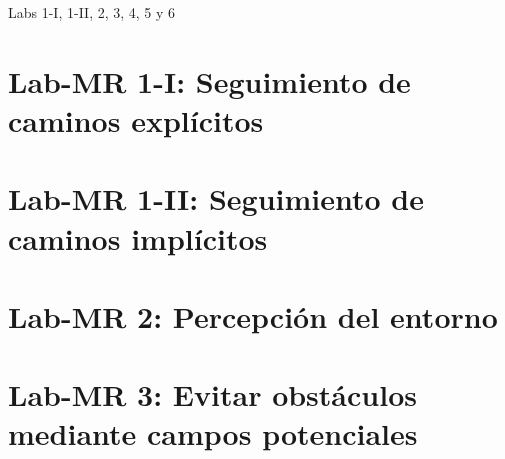 \documentclass[12pt]{report}
\newcommand{\commonpath}{../../common}
\begin{document}
\renewcommand{\pioneer}{\matlab}

%
        {Labs 1-I, 1-II, 2, 3, 4, 5 y 6}

\tableofcontents
\clearpage


\chapter{Lab-MR 1-I: Seguimiento de caminos expl\'{i}citos}
\graphicspath{{../lab1-I_caminos_explicitos/figures/}{\commonpath/img/}}


\clearpage


\chapter{Lab-MR 1-II: Seguimiento de caminos impl\'{i}citos}
\graphicspath{{../lab1-II_caminos_implicitos/figures/}{\commonpath/img/}}


\clearpage


\chapter{Lab-MR 2: Percepci\'{o}n del entorno}
\graphicspath{{../lab2_percepcion/figures/}{\commonpath/img/}}


\clearpage


\chapter{Lab-MR 3: Evitar obst\'{a}culos mediante campos potenciales}
\graphicspath{{../lab3_campos_potenciales/figures/}{\commonpath/img/}}


\clearpage
\end{document}
